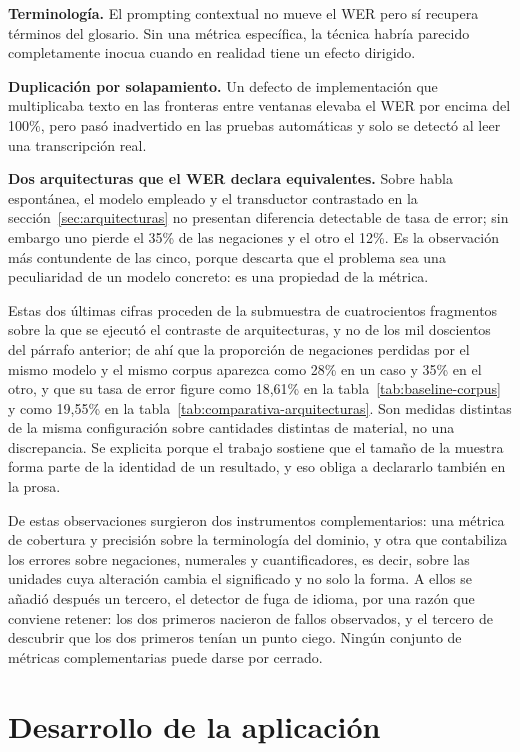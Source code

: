 \textbf{Terminología.} El prompting contextual no mueve el WER pero sí recupera términos
del glosario. Sin una métrica específica, la técnica habría parecido completamente
inocua cuando en realidad tiene un efecto dirigido.

\textbf{Duplicación por solapamiento.} Un defecto de implementación que multiplicaba texto
en las fronteras entre ventanas elevaba el WER por encima del 100\%, pero pasó inadvertido
en las pruebas automáticas y solo se detectó al leer una transcripción real.

\textbf{Dos arquitecturas que el WER declara equivalentes.} Sobre habla espontánea, el
modelo empleado y el transductor contrastado en la sección~\ref{sec:arquitecturas} no
presentan diferencia detectable de tasa de error; sin embargo uno pierde el 35\% de las
negaciones y el otro el 12\%. Es la observación más contundente de las cinco, porque descarta
que el problema sea una peculiaridad de un modelo concreto: es una propiedad de la métrica.

Estas dos últimas cifras proceden de la submuestra de cuatrocientos fragmentos sobre la que
se ejecutó el contraste de arquitecturas, y no de los mil doscientos del párrafo anterior;
de ahí que la proporción de negaciones perdidas por el mismo modelo y el mismo corpus
aparezca como 28\% en un caso y 35\% en el otro, y que su tasa de error figure como 18,61\%
en la tabla~\ref{tab:baseline-corpus} y como 19,55\% en la
tabla~\ref{tab:comparativa-arquitecturas}. Son medidas distintas de la misma configuración
sobre cantidades distintas de material, no una discrepancia. Se explicita porque el trabajo
sostiene que el tamaño de la muestra forma parte de la identidad de un resultado, y eso
obliga a declararlo también en la prosa.

De estas observaciones surgieron dos instrumentos complementarios: una métrica de
cobertura y precisión sobre la terminología del dominio, y otra que contabiliza los errores
sobre negaciones, numerales y cuantificadores, es decir, sobre las unidades cuya
alteración cambia el significado y no solo la forma. A ellos se añadió después un tercero,
el detector de fuga de idioma, por una razón que conviene retener: los dos primeros nacieron
de fallos observados, y el tercero de descubrir que los dos primeros tenían un punto ciego.
Ningún conjunto de métricas complementarias puede darse por cerrado.

\section{Desarrollo de la aplicación}

